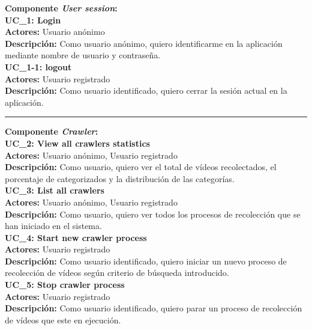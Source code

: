 \documentclass[11pt,a4paper]{article}
\begin{document}
\noindent\textbf{Componente \textit{User session}:}
\\

\noindent\textbf{UC\_1: Login}\\
\textbf{Actores:} Usuario anónimo\\
\textbf{Descripción:} Como usuario anónimo, quiero identificarme en la aplicación mediante nombre de usuario y contraseña.
\\

\noindent\textbf{UC\_1-1: logout}\\
\textbf{Actores:} Usuario registrado\\
\textbf{Descripción:} Como usuario identificado, quiero cerrar la sesión actual en la aplicación.
\\

\begin{center}\rule{10cm}{0.4pt}\end{center}

\noindent\textbf{Componente \textit{Crawler}:}
\\

\noindent\textbf{UC\_2: View all crawlers statistics}\\
\textbf{Actores:} Usuario anónimo, Usuario registrado\\
\textbf{Descripción:} Como usuario, quiero ver el total de vídeos recolectados, el porcentaje de categorizados y la distribución de las categorías.
\\

\noindent\textbf{UC\_3: List all crawlers}\\
\textbf{Actores:} Usuario anónimo, Usuario registrado\\
\textbf{Descripción:} Como usuario, quiero ver todos los procesos de recolección que se han iniciado en el sistema.
\\

\noindent\textbf{UC\_4: Start new crawler process}\\
\textbf{Actores:} Usuario registrado\\
\textbf{Descripción:} Como usuario identificado, quiero iniciar un nuevo proceso de recolección de vídeos según criterio de búsqueda introducido.
\\

\noindent\textbf{UC\_5: Stop crawler process}\\
\textbf{Actores:} Usuario registrado\\
\textbf{Descripción:} Como usuario identificado, quiero parar un proceso de recolección de vídeos que este en ejecución.
\\
\end{document}
